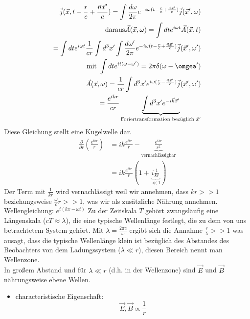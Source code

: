 \documentclass[a4paper]{article}
\begin{document}
\begin{align}
\vec{j}(\vec{x},t-\frac{r}{c}+\frac{\vec{n}\vec{x}'}{c})=\int
\frac{d\omega}{2\pi} e^{-i\omega (t-\frac{r}{c}+\frac{\vec{n}\vec{x}'}{c})}
\vec{j}(\vec{x}',\omega)\\
\text{daraus} \vec{A}(\vec{x},\omega)=\int dt e^{i\omega t} \vec{A}(\vec{x},t)\\
=\int dt e^{i\omega t} \frac{1}{cr} \int d^3x'\int \frac{d\omega'}{2\pi} 
e^{-i\omega (t-\frac{r}{c}+\frac{\vec{n}\vec{x}'}{c})}
\vec{j}(\vec{x}',\omega')\\
\text{ mit } \int dt e^{it(\omega-\omega')}=2\pi \delta(\omega-\omgea')\\
\vec{A}(\vec{x},\omega)=\frac{1}{cr} \int d^3x' e^{i\omega
(\frac{r}{c}-\frac{\vec{n}\vec{x}'}{c})} \vec{j}(\vec{x}',\omega')\\
=\frac{e^{ikr}}{cr} \underbrace{\int d^3x'
e^{-i\vec{k}\vec{x}'}}_{\text{Foriertransformation bezüglich }\vec{x}'}\\
\end{align}
Diese Gleichung stellt eine Kugelwelle dar.\\
\begin{align}
\frac{\partial}{\partial r}\left( \frac{e^{ikr}}{r}
\right)&=ik\frac{e^{ikr}}{r}-\underbrace{\frac{e^{ikr}}{r^2}}_{\text{vernachlässigbar}}\\
&=ik\frac{e^{ikr}}{r}\left(1+\underbrace{i\frac{1}{kr}}_{ \ll 1}\right)
\end{align}
Der Term mit $\frac{1}{kr}$ wird vernachlässigt weil wir annehmen, dass $kr>>1$
beziehungsweise $\frac{\omega}{c}r>>1$, was wir als zusätzliche Nährung
annehmen.\\
Wellengleichung: $e^{i\left(kx-\omega t\right)}$
Zu der Zeitskala $T$ gehört zwangsläufig eine Längenskala ($cT\approx\lambda$), die
eine typische Wellenlänge festlegt, die zu dem von uns betrachtetem System
gehört. Mit $\lambda=\frac{2\pi c}{\omega}$ ergibt sich die Annahme
$\frac{r}{\lambda}>>1$ was ausagt, dass die typische Wellenlänge klein ist
bezüglich des Abstandes des Beobachters von dem Ladungssystem ($\lambda \ll r$),
diesen Bereich nennt man Wellenzone.\\
In großem Abstand und für $\lambda \ll r$ (d.h. in der Wellenzone) sind $\vec{E}$
und $\vec{B}$ nährungsweise ebene Wellen.
\begin{itemize}
  \item characteristische Eigenschaft: \\ \begin{equation}
  \vec{E},\vec{B}\propto \frac{1}{r}
  \end{equation}
\end{itemize}
\end{document}
